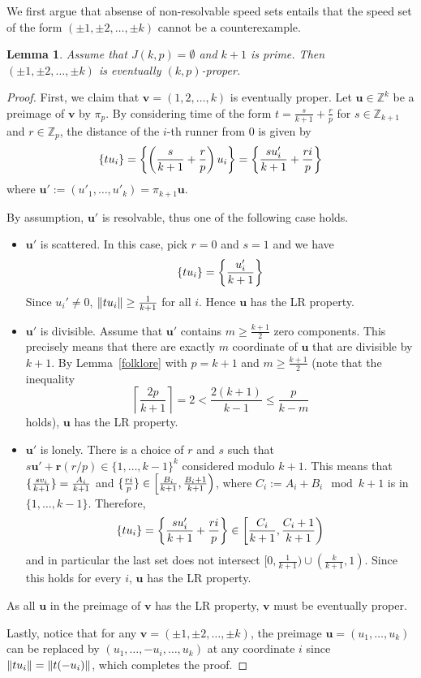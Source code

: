 \documentclass[11pt]{amsart}
\DeclarePairedDelimiter\norm{\lVert}{\rVert}
\DeclarePairedDelimiter\fracpart{\{}{\}}
\newcommand{\Int}[1]{\mathbb Z_{#1}}
\newcommand{\Z}{\mathbb{Z}}
\newcommand{\Zko}{\Int{k+1}}
\newcommand{\Zp}{\Int{p}}
\newcommand{\rbf}{\mathbf{r}}
\newcommand{\vbf}{\mathbf{v}}
\newcommand{\ubf}{\mathbf{u}}
\newtheorem{lemma}[theorem]{Lemma}
\theoremstyle{definition}
\theoremstyle{remark}
\begin{document}
We first argue that absense of non-resolvable speed sets entails that the speed set of the form $(\pm1, \pm2, \dots, \pm k)$
cannot be a counterexample.
\begin{lemma}
\label{lem:resolvable}
    Assume that $J(k,p) = \emptyset$ and $k+1$ is prime. Then $(\pm1,\pm2,\ldots,\pm k)$ is eventually $(k,p)$-proper.    
\end{lemma}
\begin{proof}
    First, we claim that $\vbf = (1,2,\ldots,k)$ is eventually proper. 
    Let $\ubf \in \Z^k$ be a preimage of $\vbf$ by $\pi_{p}$.
    By considering time of the form $t=\frac{s}{k+1}+\frac{r}{p}$ for $s\in\Zko$ and $r\in\Zp$, 
    the distance of the $i$-th runner from $0$ is given by
    \[ \fracpart{tu_i}=\fracpart*{\left(\frac{s}{k+1}+\frac{r}{p}\right) u_i}=\fracpart*{\frac{su'_i}{k+1}+\frac{ri}{p}} \] 
    where $\ubf' := (u'_1, \dots, u'_k) = \pi_{k+1} \ubf$.

    By assumption, $\ubf'$ is resolvable, thus one of the following case holds.
    \begin{itemize}
        \item $\ubf'$ is scattered. In this case, pick $r=0$ and $s=1$ and we have 
          \[ \fracpart{tu_i}=\fracpart*{\frac{u'_i}{k+1}} \]
          Since $u_i' \ne 0$, $\norm{tu_i} \ge \frac{1}{k+1}$ for all $i$.
          Hence $\ubf$ has the LR property.
        \item $\ubf'$ is divisible. Assume that $\ubf'$ contains $m \ge \frac{k+1}{2}$ zero components. 
          This precisely means that there are exactly $m$ coordinate of $\ubf$ that are divisible by $k+1$.
          By Lemma~\ref{folklore} with $p=k+1$ and $m \ge \frac{k+1}{2}$ 
          (note that the inequality
          \[\left\lceil \frac{2p}{k+1} \right\rceil = 2 < \frac{2(k+1)}{k-1} \leq \frac{p}{k-m}\] 
          holds),
          $\ubf$ has the LR property.
        \item $\ubf'$ is lonely.
          There is a choice of $r$ and $s$ such that $ s\ubf' + \rbf(r/p) \in \{1,\ldots,k-1\}^k$ considered modulo $k+1$. 
          This means that $\fracpart{\frac{sv_i}{k+1}}=\frac{A_i}{k+1}$ and 
          $\fracpart{\frac{ri}{p}}\in\left[\frac{B_i}{k+1},\frac{B_i+1}{k+1}\right)$, where $C_i:=A_i+B_i\mod{k+1}$ 
          is in $\{1,\ldots,k-1\}$. Therefore,
          \[\fracpart{tu_i}=\fracpart*{\frac{su_i'}{k+1}+\frac{ri}{p}}\in\left[\frac{C_i}{k+1},\frac{C_i+1}{k+1}\right)\]
          and in particular the last set does not intersect $[0,\frac{1}{k+1})\cup(\frac{k}{k+1},1)$.  
          Since this holds for every $i$, $\ubf$ has the LR property.
    \end{itemize}
    
    As all $\ubf$ in the preimage of $\vbf$ has the LR property, $\vbf$ must be eventually proper.
    
    Lastly, notice that for any $\vbf = (\pm 1, \pm 2, \dots, \pm k)$, the preimage $\ubf = (u_1, \dots, u_k)$ can be replaced 
    by $(u_1, \dots, -u_i, \dots, u_k)$ at any coordinate $i$ since $\norm{tu_i} = \norm{t(-u_i)}$, which completes the proof.
\end{proof}
\end{document}
